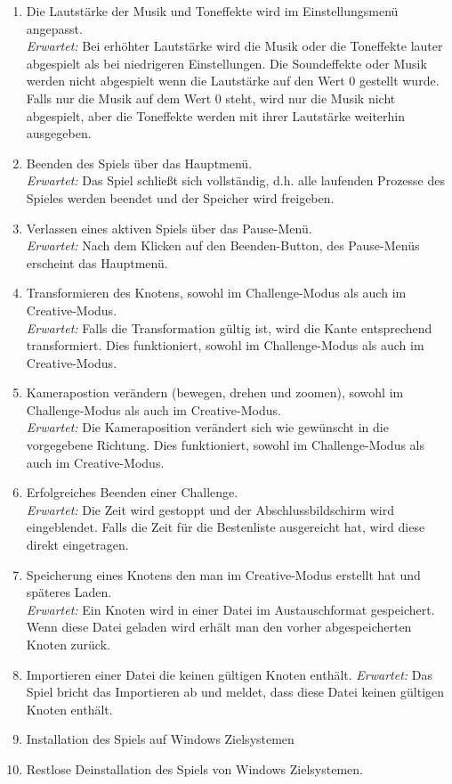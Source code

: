 \begin{enumerate}
\item Die Lautstärke der Musik und Toneffekte wird im Einstellungsmenü angepasst. \\  
\textit{Erwartet:} Bei erhöhter Lautstärke wird die Musik oder die Toneffekte lauter abgespielt als bei niedrigeren Einstellungen. Die Soundeffekte oder Musik werden nicht abgespielt wenn die Lautstärke auf den Wert 0 gestellt wurde. Falls nur die Musik auf dem Wert 0 steht, wird nur die Musik nicht abgespielt, aber die Toneffekte werden mit ihrer Lautstärke weiterhin ausgegeben.
\item Beenden des Spiels über das Hauptmenü.\\
\textit{Erwartet:} Das Spiel schließt sich vollständig, d.h. alle laufenden Prozesse des Spieles werden beendet und der Speicher wird freigeben.
\item Verlassen eines aktiven Spiels über das Pause-Menü.\\
\textit{Erwartet:} Nach dem Klicken auf den Beenden-Button, des Pause-Menüs erscheint das Hauptmenü.
\item Transformieren des Knotens, sowohl im Challenge-Modus als auch im Creative-Modus.\\
\textit{Erwartet:} Falls die Transformation gültig ist, wird die Kante entsprechend transformiert. Dies funktioniert, sowohl im Challenge-Modus als auch im Creative-Modus.
\item Kamerapostion verändern (bewegen, drehen und zoomen), sowohl im Challenge-Modus als auch im Creative-Modus.\\
\textit{Erwartet:} Die Kameraposition verändert sich wie gewünscht in die vorgegebene Richtung. Dies funktioniert, sowohl im Challenge-Modus als auch im Creative-Modus.
\item Erfolgreiches Beenden einer Challenge. \\
\textit{Erwartet:} Die Zeit wird gestoppt und der Abschlussbildschirm wird eingeblendet. Falls die Zeit für die Bestenliste ausgereicht hat, wird diese direkt eingetragen.
\item Speicherung eines Knotens den man im Creative-Modus erstellt hat und späteres Laden.\\
\textit{Erwartet:} Ein Knoten wird in einer Datei im Austauschformat gespeichert. Wenn diese Datei geladen wird erhält man den vorher abgespeicherten Knoten zurück.
\item Importieren einer Datei die keinen gültigen Knoten enthält.
\textit{Erwartet:} Das Spiel bricht das Importieren ab und meldet, dass diese Datei keinen gültigen Knoten enthält.
\item Installation des Spiels auf Windows Zielsystemen
\item Restlose Deinstallation des Spiels von Windows Zielsystemen.

\end{enumerate}


